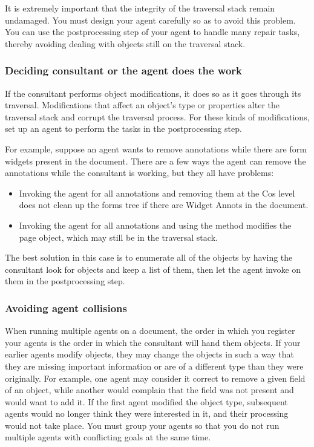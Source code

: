 \documentclass[letterpaper,12pt,english,openany,oneside]{sphinxmanual}
\begin{document}
It is extremely important that the integrity of the traversal stack remain undamaged. You must design your agent carefully so as to avoid this problem. You can use the postprocessing step of your agent to handle many repair tasks, thereby avoiding dealing with objects still on the traversal stack.


\subsubsection{Deciding consultant or the agent does the work}
\label{\detokenize{Plugins_ExtendedAPI:deciding-consultant-or-the-agent-does-the-work}}
If the consultant performs object modifications, it does so as it goes through its traversal. Modifications that affect an object’s type or properties alter the traversal stack and corrupt the traversal process. For these kinds of modifications, set up an agent to perform the tasks in the postprocessing step.

For example, suppose an agent wants to remove annotations while there are form widgets present in the document. There are a few ways the agent can remove the annotations while the consultant is working, but they all have problems:
\begin{itemize}
\item {} 
Invoking the agent for all annotations and removing them at the Cos level does not clean up the forms tree if there are Widget Annots in the document.

\item {} 
Invoking the agent for all annotations and using the  method modifies the page object, which may still be in the traversal stack.

\end{itemize}

The best solution in this case is to enumerate all of the  objects by having the consultant look for  objects and keep a list of them, then let the agent invoke  on them in the post\sphinxhyphen{}processing step.


\subsubsection{Avoiding agent collisions}
\label{\detokenize{Plugins_ExtendedAPI:avoiding-agent-collisions}}
When running multiple agents on a document, the order in which you register your agents is the order in which the consultant will hand them objects. If your earlier agents modify objects, they may change the objects in such a way that they are missing important information or are of a different type than they were originally. For example, one agent may consider it correct to remove a given field of an object, while another would complain that the field was not present and would want to add it. If the first agent modified the object type, subsequent agents would no longer think they were interested in it, and their processing would not take place. You must group your agents so that you do not run multiple agents with conflicting goals at the same time.
\end{document}
